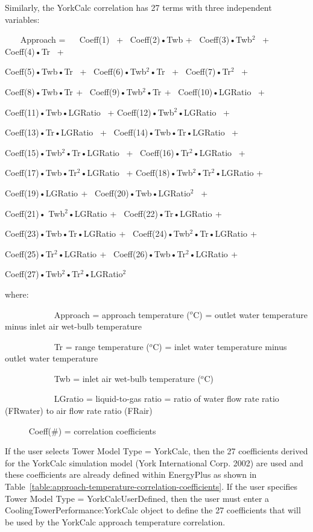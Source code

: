 Similarly, the YorkCalc correlation has 27 terms with three independent variables:

~~~ Approach = ~~ Coeff(1)~ +~ Coeff(2)•Twb +~ Coeff(3)•Twb\(^{2}\)~ +~ Coeff(4)•Tr~ +

Coeff(5)•Twb•Tr~ +~ Coeff(6)•Twb\(^{2}\)•Tr~ +~ Coeff(7)•Tr\(^{2}\)~ +

Coeff(8)•Twb•Tr\(^{ }\) +~ Coeff(9)•Twb\(^{2}\)•Tr\(^{ }\) +~ Coeff(10)•LGRatio~ +

Coeff(11)•Twb•LGRatio~ + Coeff(12)•Twb\(^{2}\)•LGRatio~ +

Coeff(13)•Tr•LGRatio~ +~ Coeff(14)•Twb•Tr•LGRatio~ +

Coeff(15)•Twb\(^{2}\)•Tr•LGRatio~ +~ Coeff(16)•Tr\(^{2}\)•LGRatio~ +

Coeff(17)•Twb•Tr\(^{2}\)•LGRatio~ + Coeff(18)•Twb\(^{2}\)•Tr\(^{2}\)•LGRatio +

Coeff(19)•LGRatio\(^{ }\) +~ Coeff(20)•Twb•LGRatio\(^{2}\)~ +

Coeff(21)• Twb\(^{2}\)•LGRatio\(^{ }\) +~ Coeff(22)•Tr•LGRatio\(^{ }\) +

Coeff(23)•Twb•Tr•LGRatio\(^{ }\) +~ Coeff(24)•Twb\(^{2}\)•Tr•LGRatio\(^{ }\) +

Coeff(25)•Tr\(^{2}\)•LGRatio\(^{ }\) +~ Coeff(26)•Twb•Tr\(^{2}\)•LGRatio\(^{ }\) +

Coeff(27)•Twb\(^{2}\)•Tr\(^{2}\)•LGRatio\(^{2}\)

where:

~~~~~~~~~~~ Approach = approach temperature (\(^{o}\)C) = outlet water temperature minus inlet air wet-bulb temperature

~~~~~~~~~~~ Tr = range temperature (\(^{o}\)C) = inlet water temperature minus outlet water temperature

~~~~~~~~~~~ Twb = inlet air wet-bulb temperature (\(^{o}\)C)

~~~~~~~~~~~ LGratio = liquid-to-gas ratio = ratio of water flow rate ratio (FRwater) to air flow rate ratio (FRair)

~~~~~ Coeff(\#) = correlation coefficients

If the user selects Tower Model Type = YorkCalc, then the 27 coefficients derived for the YorkCalc simulation model (York International Corp. 2002) are used and these coefficients are already defined within EnergyPlus as shown in Table~\ref{table:approach-temperature-correlation-coefficients}. If the user specifies Tower Model Type = YorkCalcUserDefined, then the user must enter a CoolingTowerPerformance:YorkCalc object to define the 27 coefficients that will be used by the YorkCalc approach temperature correlation.

